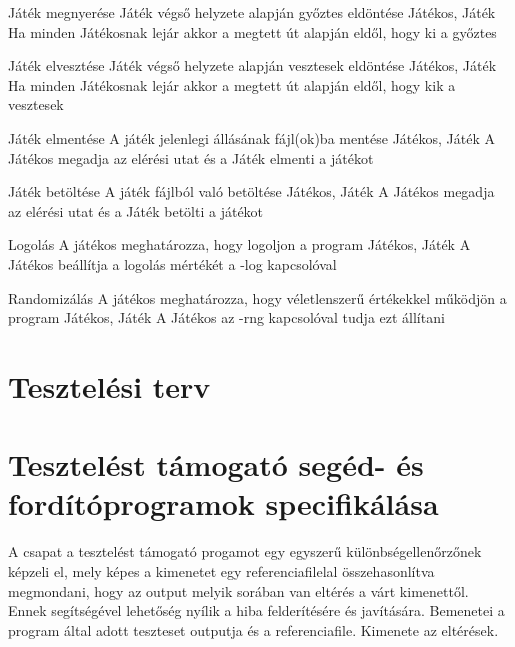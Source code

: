 \usecase%
{Játék megnyerése}%
{Játék végső helyzete alapján győztes eldöntése}%
{Játékos, Játék}%
{Ha minden Játékosnak lejár akkor a megtett út alapján eldől, hogy ki a győztes}

\usecase%
{Játék elvesztése}%
{Játék végső helyzete alapján vesztesek eldöntése}%
{Játékos, Játék}%
{Ha minden Játékosnak lejár akkor a megtett út alapján eldől, hogy kik a vesztesek}

\usecase%
{Játék elmentése}
{A játék jelenlegi állásának fájl(ok)ba mentése}
{Játékos, Játék}
{A Játékos megadja az elérési utat és a Játék elmenti a játékot}

\usecase%
{Játék betöltése}
{A játék fájlból való betöltése}
{Játékos, Játék}
{A Játékos megadja az elérési utat és a Játék betölti a játékot}

\usecase%
{Logolás}
{A játékos meghatározza, hogy logoljon a program}
{Játékos, Játék}
{A Játékos beállítja a logolás mértékét a -log kapcsolóval}

\usecase%
{Randomizálás}
{A játékos meghatározza, hogy véletlenszerű értékekkel működjön a program}
{Játékos, Játék}
{A Játékos az -rng kapcsolóval tudja ezt állítani}


\section{Tesztelési terv}


\section{Tesztelést támogató segéd- és fordítóprogramok specifikálása}
A csapat a tesztelést támogató progamot egy egyszerű különbségellenőrzőnek képzeli el, mely képes a kimenetet egy referenciafilelal összehasonlítva megmondani,
hogy az output melyik sorában van eltérés a várt kimenettől. Ennek segítségével lehetőség nyílik a hiba felderítésére és javítására. Bemenetei a program által adott
teszteset outputja és a referenciafile. Kimenete az eltérések. 

